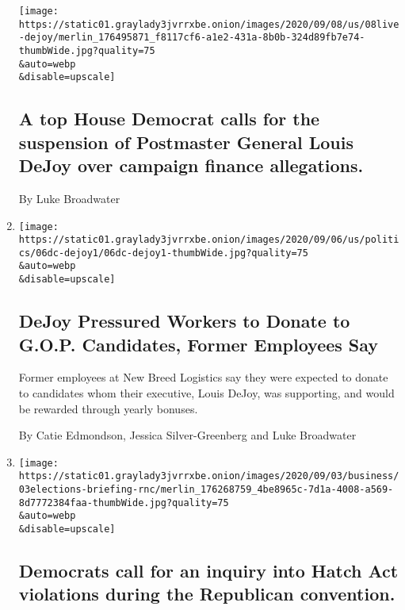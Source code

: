 \begin{enumerate}
  \texttt{[image: https://static01.graylady3jvrrxbe.onion/images/2020/09/08/us/08live-dejoy/merlin\_176495871\_f8117cf6-a1e2-431a-8b0b-324d89fb7e74-thumbWide.jpg?quality=75\\\&auto=webp\\\&disable=upscale]}

  \hypertarget{a-top-house-democrat-calls-for-the-suspension-of-postmaster-general-louis-dejoy-over-campaign-finance-allegations}{%
  \subsection{A top House Democrat calls for the suspension of
  Postmaster General Louis DeJoy over campaign finance
  allegations.}\label{a-top-house-democrat-calls-for-the-suspension-of-postmaster-general-louis-dejoy-over-campaign-finance-allegations}}

  By Luke Broadwater
\item
  \href{/2020/09/06/us/politics/dejoy-political-donations.html}{}

  \texttt{[image: https://static01.graylady3jvrrxbe.onion/images/2020/09/06/us/politics/06dc-dejoy1/06dc-dejoy1-thumbWide.jpg?quality=75\\\&auto=webp\\\&disable=upscale]}

  \hypertarget{dejoy-pressured-workers-to-donate-to-gop-candidates-former-employees-say}{%
  \subsection{DeJoy Pressured Workers to Donate to G.O.P. Candidates,
  Former Employees
  Say}\label{dejoy-pressured-workers-to-donate-to-gop-candidates-former-employees-say}}

  Former employees at New Breed Logistics say they were expected to
  donate to candidates whom their executive, Louis DeJoy, was
  supporting, and would be rewarded through yearly bonuses.

  By Catie Edmondson, Jessica Silver-Greenberg and Luke Broadwater
\item
  \href{/live/2020/09/03/us/trump-vs-biden/democrats-call-for-an-inquiry-into-hatch-act-violations-during-the-republican-convention}{}

  \texttt{[image: https://static01.graylady3jvrrxbe.onion/images/2020/09/03/business/03elections-briefing-rnc/merlin\_176268759\_4be8965c-7d1a-4008-a569-8d7772384faa-thumbWide.jpg?quality=75\\\&auto=webp\\\&disable=upscale]}

  \hypertarget{democrats-call-for-an-inquiry-into-hatch-act-violations-during-the-republican-convention}{%
  \subsection{Democrats call for an inquiry into Hatch Act violations
  during the Republican
  convention.}\label{democrats-call-for-an-inquiry-into-hatch-act-violations-during-the-republican-convention}}


\end{enumerate}
